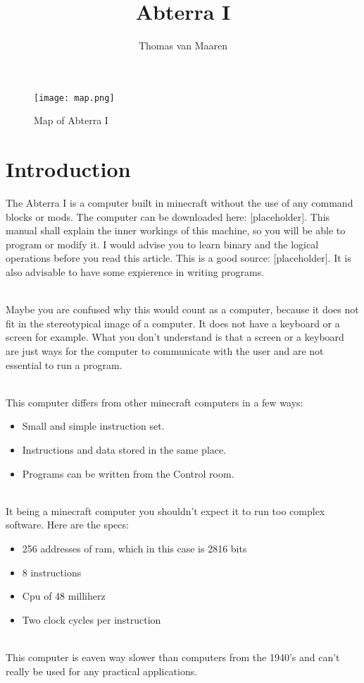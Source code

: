 \documentclass{article}
\title{Abterra I}
\author{Thomas van Maaren}
\newcommand{\Website}{[placeholder]}
\newcommand{\BinaryWebsite}{[placeholder]}
\begin{document}
\maketitle

\begin{figure}
	\texttt{[image: map.png]}
	\caption{Map of Abterra I}
\end{figure}
\section{Introduction}
The Abterra I is a computer built in minecraft without the use of any command blocks or mods. The computer can be downloaded here: \Website. This manual shall explain the inner workings of this machine, so you will be able to program or modify it. I would advise you to learn binary and the logical operations before you read this article. This is a good source: \BinaryWebsite. It is also advisable to have some expierence in writing programs.

~\\
Maybe you are confused why this would count as a computer, because it does not fit in the stereotypical image of a computer. It does not have a keyboard or a screen for example. What you don't understand is that a screen or a keyboard are just ways for the computer to communicate with the user and are not essential to run a program.

~\\
This computer differs from other minecraft computers in a few ways:
\begin{itemize}
	\item Small and simple instruction set.
	\item Instructions and data stored in the same place.
	\item Programs can be written from the Control room.
\end{itemize}
~\\
It being a minecraft computer you shouldn't expect it to run too complex software. Here are the specs:
\begin{itemize}
	\item 256 addresses of ram, which in this case is 2816 bits
	\item 8 instructions
	\item Cpu of 48 milliherz
	\item Two clock cycles per instruction
\end{itemize}
~\\
This computer is eaven way slower than computers from the 1940's and can't really be used for any practical applications.
\end{document}
